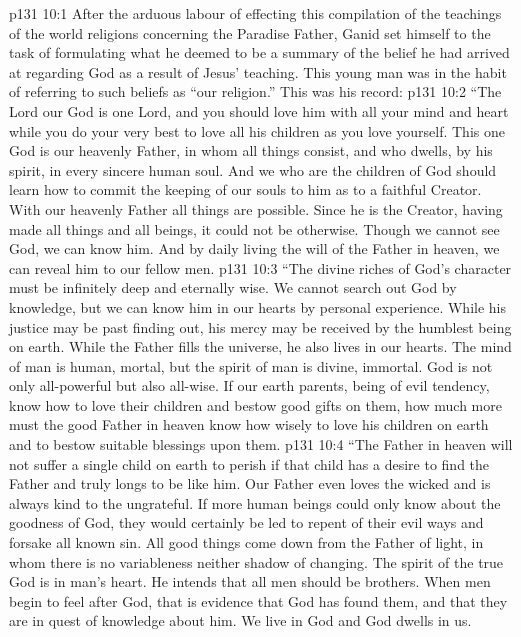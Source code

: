 \vs p131 10:1 After the arduous labour of effecting this compilation of the teachings of the world religions concerning the Paradise Father, Ganid set himself to the task of formulating what he deemed to be a summary of the belief he had arrived at regarding God as a result of Jesus’ teaching. This young man was in the habit of referring to such beliefs as “our religion.” This was his record:
\vs p131 10:2 \pc “The Lord our God is one Lord, and you should love him with all your mind and heart while you do your very best to love all his children as you love yourself. This one God is our heavenly Father, in whom all things consist, and who dwells, by his spirit, in every sincere human soul. And we who are the children of God should learn how to commit the keeping of our souls to him as to a faithful Creator. With our heavenly Father all things are possible. Since he is the Creator, having made all things and all beings, it could not be otherwise. Though we cannot see God, we can know him. And by daily living the will of the Father in heaven, we can reveal him to our fellow men.
\vs p131 10:3 “The divine riches of God’s character must be infinitely deep and eternally wise. We cannot search out God by knowledge, but we can know him in our hearts by personal experience. While his justice may be past finding out, his mercy may be received by the humblest being on earth. While the Father fills the universe, he also lives in our hearts. The mind of man is human, mortal, but the spirit of man is divine, immortal. God is not only all\hyp{}powerful but also all\hyp{}wise. If our earth parents, being of evil tendency, know how to love their children and bestow good gifts on them, how much more must the good Father in heaven know how wisely to love his children on earth and to bestow suitable blessings upon them.
\vs p131 10:4 “The Father in heaven will not suffer a single child on earth to perish if that child has a desire to find the Father and truly longs to be like him. Our Father even loves the wicked and is always kind to the ungrateful. If more human beings could only know about the goodness of God, they would certainly be led to repent of their evil ways and forsake all known sin. All good things come down from the Father of light, in whom there is no variableness neither shadow of changing. The spirit of the true God is in man’s heart. He intends that all men should be brothers. When men begin to feel after God, that is evidence that God has found them, and that they are in quest of knowledge about him. We live in God and God dwells in us.
